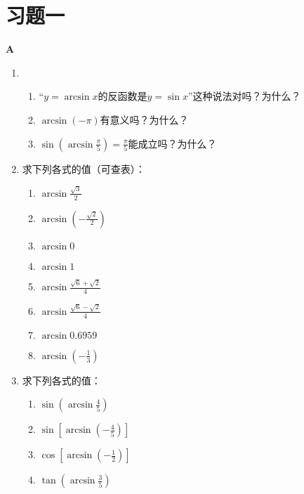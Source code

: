 \section*{习题一}
\begin{center}
\bfseries A
\end{center}

\begin{enumerate}
    \item \begin{enumerate}[(1)]
        \item “$y=\arcsin x$的反函数是$y=\sin x$”这种说法对吗？为什么？
        \item $\arcsin(-\pi)$有意义吗？为什么？
        \item $\sin\left(\arcsin \frac{\pi}{5}\right)=\frac{\pi}{5}$能成立吗？为什么？
    \end{enumerate}
\item 求下列各式的值（可查表）：
\begin{multicols}{2}
\begin{enumerate}[(1)]
    \item $\arcsin \frac{\sqrt{3}}{2}$
    \item $\arcsin \left(-\frac{\sqrt{2}}{2}\right)$
    \item $\arcsin 0$
    \item $\arcsin 1$
    \item $\arcsin \frac{\sqrt{6}+\sqrt{2}}{4}$
    \item $\arcsin\frac{\sqrt{6}-\sqrt{2}}{4}$
    \item $\arcsin 0.6959$
    \item $\arcsin \left(-\frac{1}{3}\right)$
\end{enumerate}
\end{multicols}

\item 求下列各式的值： 
\begin{multicols}{2}
\begin{enumerate}[(1)]
    \item $\sin \left(\arcsin \frac{4}{5}\right)$
    \item $\sin \left[\arcsin\left(-\frac{4}{5}\right)\right]$
    \item $\cos\left[\arcsin\left(-\frac{1}{2}\right)\right]$
    \item $\tan\left(\arcsin \frac{3}{5}\right) $
\end{enumerate}
\end{multicols}
\end{enumerate}

